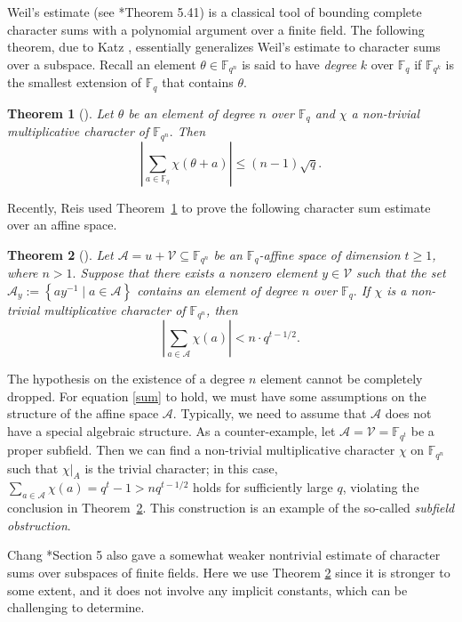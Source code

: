 \documentclass[12pt,reqno]{amsart}
\newtheorem{thm}{Theorem}[section]
\theoremstyle{definition}
\newcommand{\F}{\mathbb{F}}
\begin{document}
Weil's estimate (see \cite{LN}*{Theorem 5.41}) is a classical tool of bounding complete character sums with a polynomial argument over a finite field. The following theorem, due to Katz \cite{Katz}, essentially generalizes Weil's estimate to character sums over a subspace. Recall an element $\theta \in \F_{q^n}$ is said to have {\em degree} $k$ over $\F_q$ if $\F_{q^k}$ is the smallest extension of $\F_q$ that contains $\theta$. 


\begin{thm}[\cite{Katz}]\label{Katz}
Let $\theta$ be an element of degree $n$ over $\mathbb{F}_{q}$ and $\chi$ a non-trivial multiplicative character of $\mathbb{F}_{q^{n}} .$ Then
$$
\left|\sum_{a \in \mathbb{F}_{q}} \chi(\theta+a)\right| \leq(n-1) \sqrt{q}.
$$
\end{thm}

Recently, Reis \cite{Reis} used Theorem~\ref{Katz} to prove the following character sum estimate over an affine space.

\begin{thm}[\cite{Reis}] \label{Reis}
Let $\mathcal{A}=u+\mathcal{V} \subseteq \mathbb{F}_{q^{n}}$ be an $\mathbb{F}_{q}$-affine space of dimension $t \geq 1$, where $n>1 .$ Suppose that there exists a nonzero element $y \in \mathcal{V}$ such that the set $\mathcal{A}_{y}:=\left\{a y^{-1} \mid a \in \mathcal{A}\right\}$ contains an element of degree $n$ over $\mathbb{F}_{q} .$ If $\chi$ is a non-trivial multiplicative character of $\mathbb{F}_{q^{n}}$, then 
\begin{equation} \label{sum}
\left|\sum_{a \in \mathcal{A}} \chi(a)\right|<n \cdot q^{t-1 / 2}.    
\end{equation}
\end{thm} 

The hypothesis on the existence of a degree $n$ element cannot be completely dropped. For equation \eqref{sum} to hold, we must have some assumptions on the structure of the affine space $\mathcal{A}$. Typically, we need to assume that $\mathcal{A}$ does not have a special algebraic structure. As a counter-example, let $\mathcal{A}=\mathcal{V}=\F_{q^{t}}$ be a proper subfield. Then we can find a non-trivial multiplicative character $\chi$ on $\F_{q^n}$ such that $\chi|_{A}$ is the trivial character; in this case, 
$\sum_{a \in \mathcal{A}} \chi(a) = q^t-1>n q^{t-1/2}$ holds for sufficiently large $q$, violating the conclusion in Theorem~\ref{Reis}. This construction is an example of the so-called \emph{subfield obstruction}.  

Chang \cite{Chang}*{Section 5} also gave a somewhat weaker nontrivial estimate of character sums over subspaces of finite fields. Here we use Theorem \ref{Reis} since it is stronger to some extent, and it does not involve any implicit constants, which can be challenging to determine.
\end{document}
